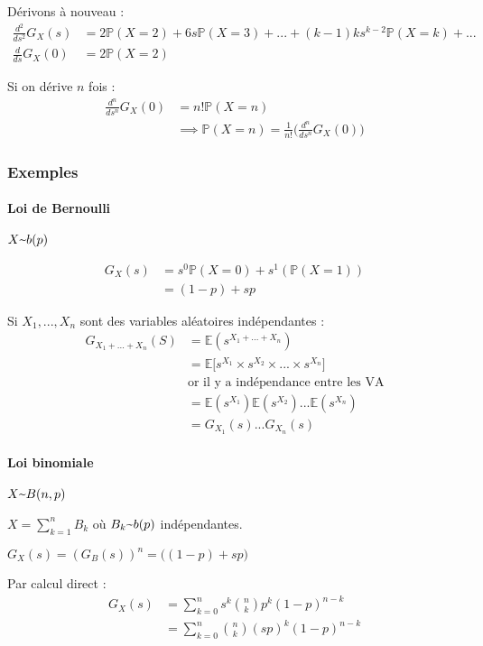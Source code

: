 \documentclass{article}
\newcommand{\textapprox}{\raisebox{0.5ex}{\texttildelow}}
\begin{document}
Dérivons à nouveau :
\begin{align*}
  \frac{d^2}{ds^2}G_X(s) &= 2\mathbb{P}(X=2) + 6s\mathbb{P}(X=3) + ... + (k-1)ks^{k-2}\mathbb{P}(X=k) + ... \\
  \frac{d}{ds}G_X(0) &= 2\mathbb{P}(X=2)
\end{align*}

Si on dérive $n$ fois :
\begin{align*}
  \frac{d^n}{ds^n}G_X(0) &= n!\mathbb{P}(X=n) \\
  &\implies \mathbb{P}(X=n) = \frac{1}{n!}\bigg(\frac{d^n}{ds^n}G_X(0)\bigg)
\end{align*}

\subsubsection{Exemples}

\paragraph{Loi de Bernoulli}

$X \textapprox b(p)$

\begin{align*}
  G_X(s) &= s^0\mathbb{P}(X=0) + s^1(\mathbb{P}(X=1)) \\
  &= (1-p) + sp
\end{align*}

Si $X_1,...,X_n$ sont des variables aléatoires indépendantes :
\begin{align*}
  G_{X_1+...+X_n}(S) &= \mathbb{E}(s^{X_1+...+X_n}) \\
  &= \mathbb{E}\Big[ s^{X_1} \times s^{X_2} \times ... \times s^{X_n} \Big] \\
  &\text{or il y a indépendance entre les VA} \\
  &= \mathbb{E}(s^{X_1})\mathbb{E}(s^{X_2})...\mathbb{E}(s^{X_n}) \\
  &= G_{X_1}(s)...G_{X_n}(s)
\end{align*}

\paragraph{Loi binomiale}
$X \textapprox B(n,p)$

$X = \sum_{k=1}^n B_k$ où $B_k \textapprox b(p)$ indépendantes.

$G_X(s) = (G_B(s))^n = \big( (1-p) + sp \big)$

Par calcul direct :
\begin{align*}
  G_X(s) &= \sum_{k=0}^n s^k \binom{n}{k} p^k(1-p)^{n-k} \\
  &= \sum_{k=0}^n \binom{n}{k}(sp)^k(1-p)^{n-k}
\end{align*}
\end{document}
